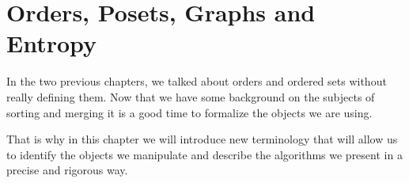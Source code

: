\chapter{Orders, Posets, Graphs and Entropy}

In the two previous chapters, we talked about orders and ordered sets without
really defining them. Now that we have some background on the subjects of
sorting and merging it is a good time to formalize the objects we are using.

That is why in this chapter we will introduce new terminology that will allow
us to identify the objects we manipulate and describe the algorithms we present
in a precise and rigorous way.

